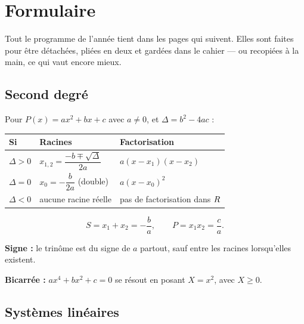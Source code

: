 \chapter{Formulaire}

Tout le programme de l'année tient dans les pages qui suivent. Elles sont
faites pour être détachées, pliées en deux et gardées dans le cahier — ou
recopiées à la main, ce qui vaut encore mieux.

\section{Second degré}

Pour $P(x) = ax^{2}+bx+c$ avec $a \neq 0$, et $\Delta = b^{2}-4ac$ :

\begin{center}
\renewcommand{\arraystretch}{1.4}
\begin{tabular}{|L{2.3cm}|L{4.9cm}|L{4.6cm}|}
\hline
\textbf{Si} & \textbf{Racines} & \textbf{Factorisation}\\
\hline
$\Delta>0$ & $x_{1,2} = \dfrac{-b \mp \sqrt\Delta}{2a}$ &
$a\left(x-x_{1}\right)\left(x-x_{2}\right)$\\
$\Delta = 0$ & $x_{0} = -\dfrac{b}{2a}$ (double) &
$a\left(x-x_{0}\right)^{2}$\\
$\Delta<0$ & aucune racine réelle & pas de factorisation dans $R$\\
\hline
\end{tabular}
\end{center}

\[
  S = x_{1}+x_{2} = -\frac ba, \qquad P = x_{1}x_{2} = \frac ca .
\]

\textbf{Signe :} le trinôme est du signe de $a$ partout, sauf entre les
racines lorsqu'elles existent.

\textbf{Bicarrée :} $ax^{4}+bx^{2}+c = 0$ se résout en posant $X = x^{2}$,
avec $X \geq 0$.

\section{Systèmes linéaires}

